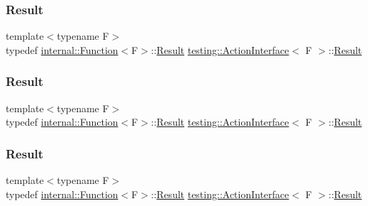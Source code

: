 \subsubsection{\texorpdfstring{Result}{Result}\hspace{0.1cm}{\footnotesize\ttfamily [1/3]}}
{\footnotesize\ttfamily template$<$typename F$>$ \\
typedef \mbox{\hyperlink{structtesting_1_1internal_1_1_function}{internal\+::\+Function}}$<$F$>$\+::\mbox{\hyperlink{classtesting_1_1_action_interface_a7477de2fe3e4e01c59db698203acaee7}{Result}} \mbox{\hyperlink{classtesting_1_1_action_interface}{testing\+::\+Action\+Interface}}$<$ F $>$\+::\mbox{\hyperlink{classtesting_1_1_action_interface_a7477de2fe3e4e01c59db698203acaee7}{Result}}}

\mbox{\label{classtesting_1_1_action_interface_a7477de2fe3e4e01c59db698203acaee7}} 
\subsubsection{\texorpdfstring{Result}{Result}\hspace{0.1cm}{\footnotesize\ttfamily [2/3]}}
{\footnotesize\ttfamily template$<$typename F$>$ \\
typedef \mbox{\hyperlink{structtesting_1_1internal_1_1_function}{internal\+::\+Function}}$<$F$>$\+::\mbox{\hyperlink{classtesting_1_1_action_interface_a7477de2fe3e4e01c59db698203acaee7}{Result}} \mbox{\hyperlink{classtesting_1_1_action_interface}{testing\+::\+Action\+Interface}}$<$ F $>$\+::\mbox{\hyperlink{classtesting_1_1_action_interface_a7477de2fe3e4e01c59db698203acaee7}{Result}}}

\mbox{\label{classtesting_1_1_action_interface_a7477de2fe3e4e01c59db698203acaee7}} 
\subsubsection{\texorpdfstring{Result}{Result}\hspace{0.1cm}{\footnotesize\ttfamily [3/3]}}
{\footnotesize\ttfamily template$<$typename F$>$ \\
typedef \mbox{\hyperlink{structtesting_1_1internal_1_1_function}{internal\+::\+Function}}$<$F$>$\+::\mbox{\hyperlink{classtesting_1_1_action_interface_a7477de2fe3e4e01c59db698203acaee7}{Result}} \mbox{\hyperlink{classtesting_1_1_action_interface}{testing\+::\+Action\+Interface}}$<$ F $>$\+::\mbox{\hyperlink{classtesting_1_1_action_interface_a7477de2fe3e4e01c59db698203acaee7}{Result}}}



